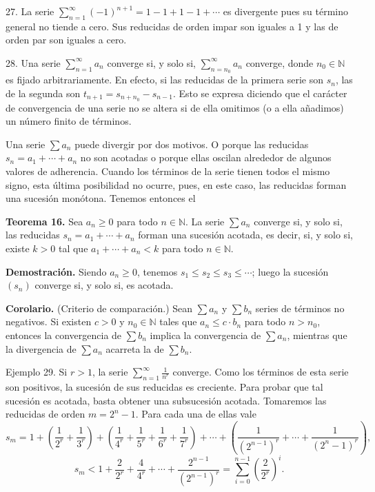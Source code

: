 \documentclass[12pt,oneside]{book}
\begin{document}
27. La serie \(\sum_{n=1}^{\infty} (-1)^{n+1} = 1 - 1 + 1 - 1 + \cdots\) es divergente pues su término general no tiende a cero. Sus reducidas de orden impar son iguales a 1 y las de orden par son iguales a cero.

28. Una serie \(\sum_{n=1}^{\infty} a_n\) converge si, y solo si, \(\sum_{n=n_0}^{\infty} a_n\) converge, donde \(n_0 \in \mathbb{N}\) es fijado arbitrariamente. En efecto, si las reducidas de la primera serie son \(s_n\), las de la segunda son \(t_{n+1} = s_{n+n_0} - s_{n-1}\). Esto se expresa diciendo que el carácter de convergencia de una serie no se altera si de ella omitimos (o a ella añadimos) un número finito de términos.

Una serie \(\sum a_n\) puede divergir por dos motivos. O porque las reducidas \(s_n = a_1 + \cdots + a_n\) no son acotadas o porque ellas oscilan alrededor de algunos valores de adherencia. Cuando los términos de la serie tienen todos el mismo signo, esta última posibilidad no ocurre, pues, en este caso, las reducidas forman una sucesión monótona. Tenemos entonces el

\textbf{Teorema 16.} Sea \(a_n \ge 0\) para todo \(n \in \mathbb{N}\). La serie \(\sum a_n\) converge si, y solo si, las reducidas \(s_n = a_1 + \cdots + a_n\) forman una sucesión acotada, es decir, si, y solo si, existe \(k > 0\) tal que \(a_1 + \cdots + a_n < k\) para todo \(n \in \mathbb{N}\).

\textbf{Demostración.} Siendo \(a_n \ge 0\), tenemos \(s_1 \le s_2 \le s_3 \le \cdots\); luego la sucesión \((s_n)\) converge si, y solo si, es acotada.

\textbf{Corolario.} (Criterio de comparación.) Sean \(\sum a_n\) y \(\sum b_n\) series de términos no negativos. Si existen \(c > 0\) y \(n_0 \in \mathbb{N}\) tales que \(a_n \le c \cdot b_n\) para todo \(n > n_0\), entonces la convergencia de \(\sum b_n\) implica la convergencia de \(\sum a_n\), mientras que la divergencia de \(\sum a_n\) acarreta la de \(\sum b_n\).

Ejemplo 29. Si \(r > 1\), la serie \(\sum_{n=1}^{\infty} \frac{1}{n^r}\) converge. Como los términos de esta serie son positivos, la sucesión de sus reducidas es creciente. Para probar que tal sucesión es acotada, basta obtener una subsucesión acotada. Tomaremos las reducidas de orden \(m = 2^n - 1\). Para cada una de ellas vale
\[
s_m = 1 + \left( \frac{1}{2^r} + \frac{1}{3^r} \right) + \left( \frac{1}{4^r} + \frac{1}{5^r} + \frac{1}{6^r} + \frac{1}{7^r} \right) + \cdots + \left( \frac{1}{(2^{n-1})^r} + \cdots + \frac{1}{(2^n - 1)^r} \right),
\]
\[
s_m < 1 + \frac{2}{2^r} + \frac{4}{4^r} + \cdots + \frac{2^{n-1}}{(2^{n-1})^r} = \sum_{i=0}^{n-1} \left( \frac{2}{2^r} \right)^i.
\]
\end{document}
